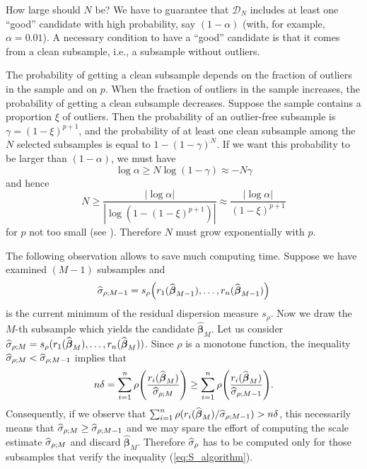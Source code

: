 How large should $N$ be? We have to guarantee that $\mathcal{D}_{N}$ includes
at least one “good” candidate with high probability, say $(1 - \alpha)$ (with,
for example, $\alpha = 0.01$). A necessary condition to have a “good” candidate
is that it comes from a clean subsample, i.e., a subsample without outliers.

The probability of getting a clean subsample depends on the fraction of
outliers in the sample and on $p$. When the fraction of outliers in the sample
increases, the probability of getting a clean subsample decreases. Suppose the
sample contains a proportion $\xi$ of outliers. Then the probability of an
outlier-free subsample is $\gamma = (1-\xi)^{p+1}$, and the probability of at
least one clean subsample among the $N$ selected subsamples is equal to
$1-(1-\gamma)^N$. If we want this probability to be larger than $(1-\alpha)$,
we must have
\[
    \log\alpha \geq N\log(1-\gamma) \approx -N\gamma
\]
and hence
%
\begin{equation}\label{eq:N}
    N \geq \frac{|\log\alpha|}{|\log(1 - (1-\xi)^{p+1})|}
    \approx \frac{|\log\alpha|}{(1-\xi)^{p+1}}
\end{equation}
%
for $p$ not too small (see \citealp{Salibian-Barrera:2004}). Therefore $N$
must grow exponentially with $p$.

The following observation allows to save much computing time. Suppose we have
examined $(M-1)$ subsamples and
\[
    \sthat{\sigma}_{\rho;M-1} = 
    s_{\rho} \left(r_1(\widehat{\boldsymbol\beta}_{M-1}), \dots,
    r_n(\widehat{\boldsymbol\beta}_{M-1})\right)
\]
is the current minimum of the residual dispersion measure $s_{\rho}$. Now we
draw the $M$-th subsample which yields the candidate
$\widehat{\boldsymbol\beta}_{M}$. Let us consider $\widehat{\sigma}_{\rho;M} =
s_{\rho}(r_1(\widehat{\boldsymbol\beta}_{M}),\allowbreak \dots,\allowbreak
r_n(\widehat{\boldsymbol\beta}_{M}))$. Since $\rho$ is a monotone function, the
inequality $\widehat{\sigma}_{\rho;M} < \widehat{\sigma}_{\rho;M-1}$ implies that
%
\begin{equation}\label{eq:S_algorithm}
    n\delta = \sum_{i=1}^{n} 
    \rho\left(\frac{r_i(\widehat{\boldsymbol\beta}_{M})}{\sthat{\sigma}_{\rho;M}}\right)
    \geq \sum_{i=1}^{n}
    \rho\left(\frac{r_i(\sthat{\boldsymbol\beta}_{M})}{\sthat{\sigma}_{\rho;M-1}}\right).
\end{equation}
%
Consequently, if we observe that $\sum_{i=1}^{n}
\rho(r_i(\widehat{\boldsymbol\beta}_{M})/\widehat{\sigma}_{\rho;M-1}) > n\delta$,
this necessarily means that $\widehat{\sigma}_{\rho;M} \geq
\widehat{\sigma}_{\rho;M-1}$ and we may spare the effort of computing the scale
estimate $\widehat{\sigma}_{\rho;M}$ and discard
$\widehat{\boldsymbol\beta}_{M}$. Therefore $\widehat{\sigma}_{\rho}$ has to be
computed only for those subsamples that verify the inequality
(\ref{eq:S_algorithm}).

